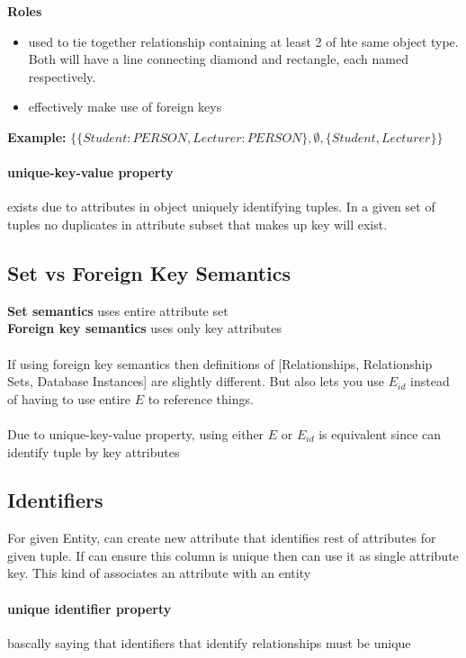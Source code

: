 \documentclass{article}
\newcommand\tab[1][0.5cm]{\hspace*{#1}}
\begin{document}
			\textbf{Roles}
			\begin{itemize}
				\item used to tie together relationship containing at least 2 of hte same object type. Both will have a line connecting diamond and rectangle, each named respectively.
				\item effectively make use of foreign keys
			\end{itemize}
			\tab \textbf{Example:} $\{\{Student:PERSON, Lecturer:PERSON\},\emptyset, \{Student, Lecturer\}\}$

		\paragraph{unique-key-value property} exists due to attributes in object uniquely identifying tuples. In a given set of tuples no duplicates in attribute subset that makes up key will exist.

	\subsection{Set vs Foreign Key Semantics}
		\textbf{Set semantics} uses entire attribute set\\
		\textbf{Foreign key semantics} uses only key attributes
		\\\\If using foreign key semantics then definitions of [Relationships, Relationship Sets, Database Instances] are slightly different. But also lets you use $E_{id}$ instead of having to use entire $E$ to reference things.
		\\\\Due to unique-key-value property, using either $E$ or $E_{id}$ is equivalent since can identify tuple by key attributes

	\subsection{Identifiers}
		For given Entity, can create new attribute that identifies rest of attributes for given tuple. If can ensure this column is unique then can use it as single attribute key. This kind of associates an attribute with an entity

		\paragraph{unique identifier property} bascally saying that identifiers that identify relationships must be unique
\end{document}
